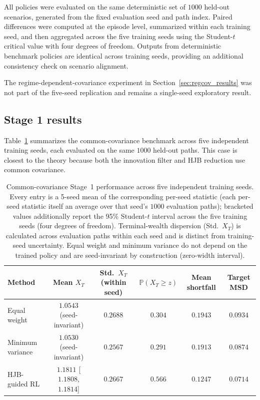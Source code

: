 \documentclass[a4paper,10pt]{article}
\newcommand{\Pbb}{\mathbb{P}}
\begin{document}
All policies were evaluated on the same deterministic set of $1000$
held-out scenarios, generated from the fixed evaluation seed and path index.
Paired differences were computed at the episode level, summarized within
each training seed, and then aggregated across the five training seeds using
the Student-$t$ critical value with four degrees of freedom. Outputs from deterministic benchmark policies are identical
across training seeds, providing
an additional consistency check on scenario alignment.

The regime-dependent-covariance experiment in
Section~\ref{sec:regcov_results} was not part of the five-seed replication
and remains a single-seed exploratory result.

\subsection{Stage 1 results}
\label{sec:stage1_results}

Table~\ref{tab:common_metrics} summarizes the common-covariance benchmark across five independent training seeds, each evaluated on the same $1000$ held-out paths. This case is closest to the theory because both the innovation filter and HJB reduction use common covariance.

\begin{table}[H]
\centering
\small
\caption{Common-covariance Stage~1 performance across five independent training seeds. Every entry is a 5-seed mean of the corresponding per-seed statistic (each per-seed statistic itself an average over that seed's $1000$ evaluation paths); bracketed values additionally report the 95\% Student-$t$ interval across the five training seeds (four degrees of freedom). Terminal-wealth dispersion (Std.\ $X_T$) is calculated across evaluation paths within each seed and is distinct from training-seed uncertainty. Equal weight and minimum variance do not depend on the trained policy and are seed-invariant by construction (zero-width interval).}
\label{tab:common_metrics}
\begin{tabular}{lccccc}
\toprule
Method & Mean $X_T$ & Std.\ $X_T$ (within seed) & $\Pbb(X_T\ge z)$ & Mean shortfall & Target MSD \\
\midrule
Equal weight & $1.0543$ (seed-invariant) & $0.2688$ & $0.304$ & $0.1943$ & $0.0934$ \\
Minimum variance & $1.0530$ (seed-invariant) & $0.2567$ & $0.291$ & $0.1913$ & $0.0874$ \\
HJB-guided RL & $1.1811$ [$1.1808$, $1.1814$] & $0.2667$ & $0.566$ & $0.1247$ & $0.0714$ \\
\bottomrule
\end{tabular}
\end{table}
\end{document}
